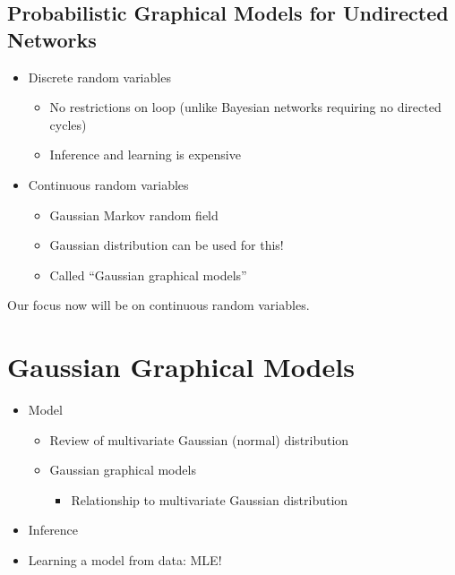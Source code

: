 \documentclass[10pt]{article}
\begin{document}
\subsection*{Probabilistic Graphical Models for Undirected Networks}
\begin{itemize}
	\item Discrete random variables
	\begin{itemize}
	    \item No restrictions on loop (unlike Bayesian networks requiring no directed cycles)
	    \item Inference and learning is expensive
    \end{itemize}
	\item Continuous random variables
	\begin{itemize}
	    \item Gaussian Markov random field
	    \item Gaussian distribution can be used for this!
	    \item Called ``Gaussian graphical models''
    \end{itemize}   
\end{itemize}
Our focus now will be on continuous random variables.

\section*{Gaussian Graphical Models}
\begin{itemize}
	\item Model
	\begin{itemize}
	    \item Review of multivariate Gaussian (normal) distribution
	    \item Gaussian graphical models
	    \begin{itemize}
	        \item Relationship to multivariate Gaussian distribution
        \end{itemize}   
    \end{itemize}   
	\item Inference
	\item Learning a model from data: MLE!
\end{itemize}
\end{document}
